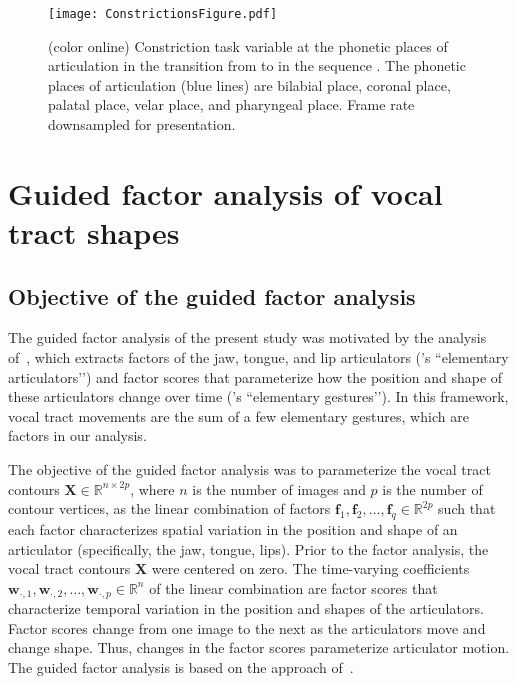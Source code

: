 \documentclass[preprint]{JASAnew}\usepackage[]{graphicx}\usepackage[]{color}
\begin{document}
\begin{figure}

\texttt{[image: ConstrictionsFigure.pdf]}

\caption{(color online) Constriction task variable at the phonetic places of articulation in the transition from \textipa{[A]} to \textipa{[i]} in the sequence \textipa{[AiA]}. The phonetic places of articulation (blue lines) are bilabial place, coronal place, palatal place, velar place, and pharyngeal place. Frame rate downsampled for presentation.}
\label{fig:constrictions}
\end{figure}




\section{Guided factor analysis of vocal tract shapes}
\label{sec:gfa}




\subsection{Objective of the guided factor analysis}
\label{subsec:objectivesoftheguidedfactoranalysis}

The guided factor analysis of the present study was motivated by the analysis of~\citet{maeda1990compensatory}, which extracts factors of the jaw, tongue, and lip articulators (\citeauthor{maeda1990compensatory}’s ``elementary articulators’’) and factor scores that parameterize how the position and shape of these articulators change over time (\citeauthor{maeda1990compensatory}’s ``elementary gestures’’). In this framework, vocal tract movements are the sum of a few elementary gestures, which are factors in our analysis. 

The objective of the guided factor analysis was to parameterize the vocal tract contours $\mathbf{X} \in \mathbb{R}^{n\times 2p}$, where $n$ is the number of images and $p$ is the number of contour vertices, as the linear combination of factors $\mathbf{f}_1, \mathbf{f}_2, \ldots, \mathbf{f}_q \in \mathbb{R}^{2p}$ such that each factor characterizes spatial variation in the position and shape of an articulator (specifically, the jaw, tongue, lips). 
%
Prior to the factor analysis, the vocal tract contours $\mathbf{X}$ were centered on zero.
%
The time-varying coefficients $\mathbf{w}_{\cdot,1},\mathbf{w}_{\cdot,2},\ldots,\mathbf{w}_{\cdot,p} \in \mathbb{R}^n$ of the linear combination are factor scores that characterize temporal variation in the position and shapes of the articulators. Factor scores change from one image to the next as the articulators move and change shape. Thus, changes in the factor scores parameterize articulator motion.
%
The guided factor analysis is based on the approach of~\citet{toutios2015factor}.
\end{document}
